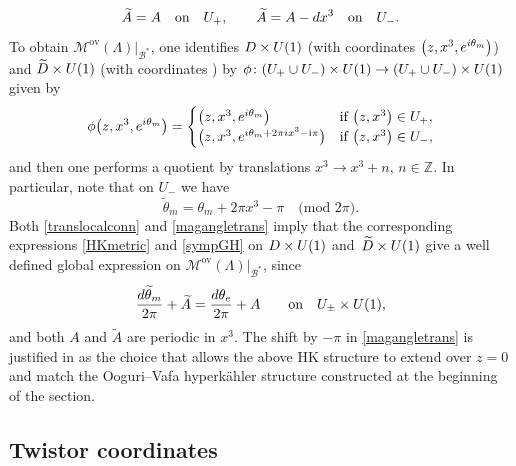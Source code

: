 \documentclass[11pt]{article}
\numberwithin{equation}{section}
\numberwithin{equation}{section}
\begin{document}
\begin{equation}\label{translocalconn}
 \widetilde{A}=A \quad \text{on}\quad U_{+}, \qquad \widetilde{A}=A -{\rm d}x^3 \quad \text{on}\quad U_{-}.
\end{equation}
To obtain $\mathcal{M}^{\text{ov}}(\Lambda)|_{\mathcal{B}^*}$, one identifies $D\times {\rm U}(1)$ \big(with coordinates $\bigl(z,x^3,{\rm e}^{{\rm i}\theta_m}\bigr)$\big) and $\widetilde{D}\times {\rm U}(1)$ \big(with coordinates \big) by $\phi\colon (U_{+}\cup U_{-})\times {\rm U}(1)\to (U_{+}\cup U_{-})\times {\rm U}(1)$ given by
\begin{equation*}
 \phi\bigl(z,x^3,{\rm e}^{{\rm i}\theta_m}\bigr)=\begin{cases}
 \bigl(z,x^3,{\rm e}^{{\rm i}\theta_m}\bigr) & \text{if} \ \bigl(z,x^3\bigr) \in U_{+},\\
 \bigl(z,x^3,{\rm e}^{{\rm i}\theta_m+2\pi {\rm i}x^3 -\mathrm{i\pi}}\bigr) & \text{if} \ \bigl(z,x^3\bigr)\in U_{-},
 \end{cases}
\end{equation*}
and then one performs a quotient by translations $x^3\to x^3+n$, $n\in \mathbb{Z}$. In particular, note that on $U_{-}$ we have
\begin{equation}\label{magangletrans}
 \widetilde{\theta}_m=\theta_m+2\pi x^3 -\pi \quad \text{(mod $2\pi$)}.
\end{equation}
Both \eqref{translocalconn} and \eqref{magangletrans} imply that the corresponding expressions \eqref{HKmetric} and \eqref{sympGH} on $D\times {\rm U}(1)$ and~${\widetilde{D}\times {\rm U}(1)}$ give a well defined global expression on $\mathcal{M}^{\text{ov}}(\Lambda)|_{\mathcal{B}^*}$, since
\begin{equation*}
\frac{{\rm d}\widetilde{\theta}_m}{2\pi}+\widetilde{A}=\frac{{\rm d}\theta_e}{2\pi}+A \qquad \text{on}\quad U_{\pm}\times {\rm U}(1),
\end{equation*}
and both $A$ and $\widetilde{A}$ are periodic in $x^3$. The shift by $-\pi$ in \eqref{magangletrans} is justified in \cite[Section 4.1]{GMN1} as the choice that allows the above HK structure to extend over $z=0$ and match the Ooguri--Vafa hyperk\"ahler structure constructed at the beginning of the section.




\subsection{Twistor coordinates}
\end{document}
